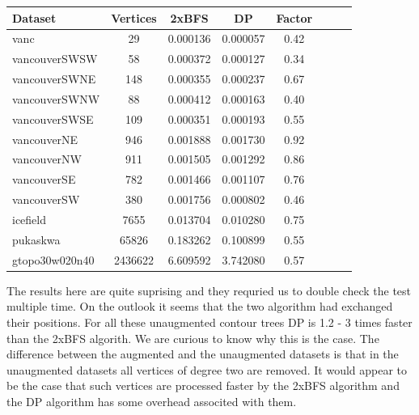 \begin{center}
\begin{tabular}{l*{6}{c}r}
Dataset                & Vertices                    & 2xBFS                             & DP                    & Factor \\
\hline
vanc	               & 29    	                     & 0.000136	                         & 0.000057	              & 0.42  \\
vancouverSWSW	       & 58   	                     & 0.000372	                         & 0.000127	              & 0.34  \\
vancouverSWNE	       & 148  	                     & 0.000355	                         & 0.000237	              & 0.67  \\
vancouverSWNW	       & 88   	                     & 0.000412	                         & 0.000163	              & 0.40  \\
vancouverSWSE	       & 109  	                     & 0.000351	                         & 0.000193	              & 0.55  \\
vancouverNE	           & 946    	                 & 0.001888	                         & 0.001730	              & 0.92  \\
vancouverNW	           & 911    	                 & 0.001505	                         & 0.001292	              & 0.86  \\
vancouverSE	           & 782    	                 & 0.001466	                         & 0.001107	              & 0.76  \\
vancouverSW	           & 380    	                 & 0.001756	                         & 0.000802	              & 0.46  \\
icefield	           & 7655  	                     & 0.013704	                         & 0.010280	              & 0.75  \\
pukaskwa	           & 65826 	                     & 0.183262	                         & 0.100899	              & 0.55  \\
gtopo30w020n40	       & 2436622 	                 & 6.609592	                         & 3.742080	              & 0.57  \\

\end{tabular}
\end{center}


The results here are quite suprising and they requried us to double check the test multiple time. On the outlook it seems that the two algorithm had exchanged their positions. For all these unaugmented contour trees DP is 1.2 - 3 times faster than the 2xBFS algorith. We are curious to know why this is the case. The difference between the augmented and the unaugmented datasets is that in the unaugmented datasets all vertices of degree two are removed. It would appear to be the case that such vertices are processed faster by the 2xBFS algorithm and the DP algorithm has some overhead associted with them.


